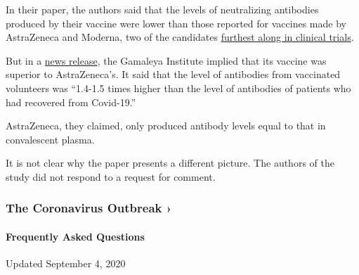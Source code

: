 In their paper, the authors said that the levels of neutralizing
antibodies produced by their vaccine were lower than those reported for
vaccines made by AstraZeneca and Moderna, two of the candidates
\href{https://www.nytimes3xbfgragh.onion/interactive/2020/science/coronavirus-vaccine-tracker.html}{furthest
along in clinical trials}.

But in a
\href{https://sputnikvaccine.com/newsroom/pressreleases/rdif-and-the-gamaleya-national-research-center-of-epidemiology-and-microbiology-announce-the-publica/}{news
release}, the Gamaleya Institute implied that its vaccine was superior
to AstraZeneca's. It said that the level of antibodies from vaccinated
volunteers was ``1.4-1.5 times higher than the level of antibodies of
patients who had recovered from Covid-19.''

AstraZeneca, they claimed, only produced antibody levels equal to that
in convalescent plasma.

It is not clear why the paper presents a different picture. The authors
of the study did not respond to a request for comment.

\href{https://www.nytimes3xbfgragh.onion/news-event/coronavirus?action=click\&pgtype=Article\&state=default\&region=MAIN_CONTENT_3\&context=storylines_faq}{}

\hypertarget{the-coronavirus-outbreak-}{%
\subsubsection{The Coronavirus Outbreak
›}\label{the-coronavirus-outbreak-}}

\hypertarget{frequently-asked-questions}{%
\paragraph{Frequently Asked
Questions}\label{frequently-asked-questions}}

Updated September 4, 2020

